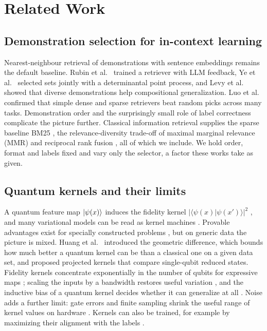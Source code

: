 \section{Related Work}

\subsection{Demonstration selection for in-context learning}
Nearest-neighbour retrieval of demonstrations with sentence embeddings \cite{liu2022makes} remains the
default baseline. Rubin et al.~\cite{rubin2022learning} trained a retriever with LLM feedback, Ye et
al.~\cite{ye2023compositional} selected sets jointly with a determinantal point process, and Levy et
al.~\cite{levy2023diverse} showed that diverse demonstrations help compositional generalization. Luo et
al.~\cite{luo2023dricl} confirmed that simple dense and sparse retrievers beat random picks across many
tasks. Demonstration order \cite{lu2022fantastically} and the surprisingly small role of label
correctness \cite{min2022rethinking} complicate the picture further. Classical information retrieval
supplies the sparse baseline BM25 \cite{robertson2009bm25}, the relevance-diversity trade-off of maximal
marginal relevance (MMR) \cite{carbonell1998mmr} and reciprocal rank fusion \cite{cormack2009rrf}, all of
which we include. We hold order, format and labels fixed and vary only the selector, a factor these
works take as given.

\subsection{Quantum kernels and their limits}
A quantum feature map $\lvert \psi(x) \rangle$ induces the fidelity kernel $|\langle\psi(x)|\psi(x')\rangle|^2$
\cite{havlicek2019supervised,schuld2019feature}, and many variational models can be read as kernel machines
\cite{schuld2021kernel}. Provable advantages exist for specially constructed problems
\cite{liu2021rigorous,glick2024covariant}, but on generic data the picture is mixed. Huang et
al.~\cite{huang2021power} introduced the geometric difference, which bounds how much better a quantum
kernel can be than a classical one on a given data set, and proposed projected kernels that compare
single-qubit reduced states. Fidelity kernels concentrate exponentially in the number of qubits for
expressive maps \cite{thanasilp2024exponential}; scaling the inputs by a bandwidth restores useful
variation \cite{shaydulin2022importance,canatar2023bandwidth}, and the inductive bias of a quantum kernel
decides whether it can generalize at all \cite{kubler2021inductive}. Noise adds a further limit: gate
errors and finite sampling shrink the useful range of kernel values on hardware
\cite{wang2021towards,heyraud2022noisy}. Kernels can also be trained, for example by maximizing their
alignment with the labels \cite{cristianini2002kta,cortes2012centered,hubregtsen2022training}.

